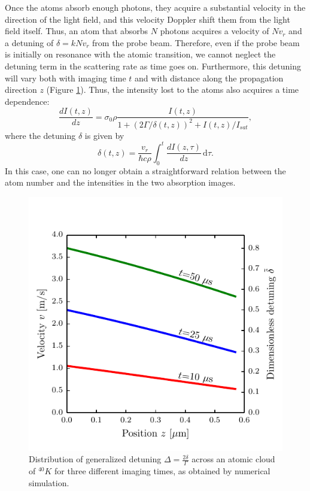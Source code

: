 \documentclass[12pt]{iopart}
\begin{document}
\par Once the atoms absorb enough photons, they acquire a substantial velocity in the direction of the light field, and this velocity Doppler shift them from the light field itself. Thus, an atom that absorbs $N$ photons acquires a velocity of $N v_r$ and a detuning of $\delta=k N v_r$ from the probe beam. Therefore, even if the probe beam is initially on resonance with the atomic transition, we cannot neglect the detuning term in the scattering rate as time goes on. Furthermore, this detuning will vary both with imaging time $t$ and with distance along the propagation direction $z$ (Figure \ref{fig:detunedBlobs}). Thus, the intensity lost to the atoms also acquires a time dependence: 
\begin{equation}
\frac{dI(t,z)}{dz}=\sigma_0 \rho \frac{I(t,z)}{1+(2\Gamma/\delta(t,z))^2 +I(t,z)/I_{sat}}, \label{eq3}
\end{equation}
where the detuning $\delta$ is given by 
\begin{equation}
\delta(t,z)=\frac{v_r}{\hbar c \rho}\int_0^t \frac{dI(z,\tau)}{dz}\,\mathrm{d}\tau. \label{eq4} 
\end{equation}
In this case, one can no longer obtain a straightforward relation between the atom number and the intensities in the two absorption images.
\begin{figure}
	\includegraphics*{figure1.pdf}
\caption{Distribution of generalized detuning $\Delta=\frac{2\delta}{\Gamma}$ across an atomic cloud of $^{40}K$ for three different imaging times, as obtained by numerical simulation.}  
\label{fig:detunedBlobs}
\end{figure}
\end{document}
